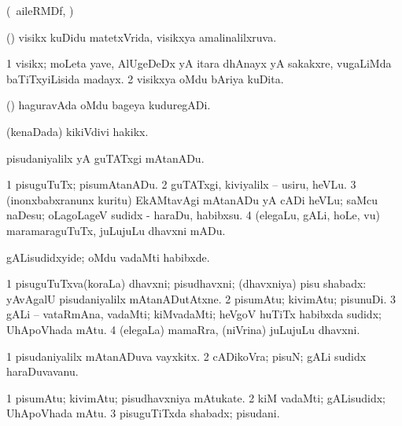 {{{{{{\bentry
{} 
\gl{\nA}
\bmng
(\kanmu\ aileRMDf, \ame)  
\emng
\eentry

\bentry
{} 
\gl{\gu}
\expl{}
\bmng
(\hA) visikx kuDidu matetxVrida, visikxya amalinalilxruva. 
\emng
\eentry

\bentry
{} 
\gl{\nA}
\bmng
\bnum
\num{1} visikx; moLeta yave, AlUgeDeDx yA itara dhAnayx yA sakakxre, \mo vugaLiMda baTiTxyiLisida madayx. 
\num{2} visikxya oMdu bAriya kuDita. 
\enum
\emng
\eentry

\bentry
{} 
\gl{\nA}
\bmng
(\ca) haguravAda oMdu bageya kuduregADi. 
\emng
\eentry

\bentry
{}
  \gl{\nA}\bmng
(kenaDada) kikiVdivi hakikx. 
\emng
\eentry

\bentry
{} 
\gl{\sakirx}
\expl{}
\bmng
pisudaniyalilx yA guTATxgi mAtanADu. 
\emng

\noindent
\gl{\akirx}
\bmng
\bnum
\num{1} pisuguTuTx; pisumAtanADu. 
\num{2} guTATxgi, kiviyalilx -- usiru, heVLu. 
\num{3} (inonxbabxranunx kuritu) EkAMtavAgi mAtanADu yA cADi heVLu; saMcu naDesu; oLagoLageV sudidx - haraDu, habibxsu. 
\num{4} (elegaLu, gALi, hoLe, \mo vu) maramaraguTuTx, juLujuLu dhavxni mADu. 
\enum
\emng

\noindent
\gl{\pagu}
\bmng
{} gALisudidxyide; oMdu vadaMti habibxde. 
\emng
\eentry

\bentry
{} 
\gl{\nA}
\expl{}
\bmng
\bnum
\num{1} pisuguTuTxva(koraLa) dhavxni; pisudhavxni; (dhavxniya) pisu shabadx:  yAvAgalU pisudaniyalilx mAtanADutAtxne. 
\num{2} pisumAtu; kivimAtu; pisunuDi. 
\num{3} gALi -- vataRmAna, vadaMti; kiMvadaMti; heVgoV huTiTx habibxda sudidx; UhApoVhada mAtu. 
\num{4} (elegaLa) mamaRra, (niVrina) juLujuLu dhavxni. 
\enum
\emng
\eentry

\bentry
{} 
\gl{\nA}
\expl{}
\bmng
\bnum
\num{1} pisudaniyalilx mAtanADuva vayxkitx. 
\num{2} cADikoVra; pisuN; gALi sudidx haraDuvavanu. 
\enum
\emng
\eentry

\bentry
{} 
\gl{\nA}
\expl{}
\bmng
\bnum
\num{1} pisumAtu; kivimAtu; pisudhavxniya mAtukate. 
\num{2} kiM vadaMti; gALisudidx; UhApoVhada mAtu. 
\num{3} pisuguTiTxda shabadx; pisudani. 
\enum
\emng

}}}}}}
